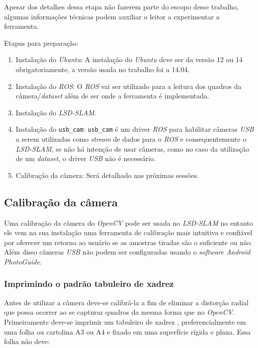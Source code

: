 Apesar dos detalhes dessa etapa não fazerem parte do escopo desse trabalho, algumas informações técnicas podem auxiliar o leitor a experimentar a ferramenta.

Etapas para preparação:

\begin{enumerate}
	\item{Instalação do \textit{Ubuntu}: A instalação do \textit{Ubuntu} deve ser da versão 12 ou 14 obrigatoriamente, a versão usada no trabalho foi a 14.04.}
	\item{Instalação do  \textit{ROS}: O \textit{ROS} vai ser utilizado para a leitura dos quadros da câmera/\textit{dataset} além de ser onde a ferramenta é implementada.\cite{ROS-Tutorial}}
	\item{Instalação do \textit{LSD-SLAM}.\cite{GitHub-LSD-SLAM}}
	\item{Instalação do  \texttt{usb\_cam}: \texttt{usb\_cam} é um driver \textit{ROS} para habilitar câmeras \textit{USB} a serem utilizadas como \textit{stream} de dados para o \textit{ROS} e consequentemente o \textit{LSD-SLAM}, se não há intenção de usar câmeras, como no caso da utilização de um \textit{dataset}, o driver \textit{USB} não é necessário.}
	\item{Calibração da câmera: Será detalhado nas próximas sessões.}
\end{enumerate}

\subsection{Calibração da câmera}

Uma calibração da câmera do \textit{OpenCV} pode ser usada no \textit{LSD-SLAM} no entanto ele vem na sua instalação uma ferramenta de calibração mais intuitiva e confiável por oferecer um retorno ao usuário se as amostras tiradas são o suficiente ou não. Além disso câmeras \textit{USB} não podem ser configuradas usando o \textit{software} \textit{Android} \textit{PhotoGuide}.

\subsubsection{Imprimindo o padrão tabuleiro de xadrez}

Antes de utilizar a câmera deve-se calibrá-la a fim de eliminar a distorção radial que possa ocorrer ao se capturar quadros da mesma forma que no \textit{OpenCV}.
Primeiramente deve-se imprimir um tabuleiro de xadrez \cite{Setup-CalibrateMonocularCamera}, preferencialmente em uma folha ou cartolina A3 ou A4 e fixado em uma superfície rígida e plana. Essa folha não deve: 

